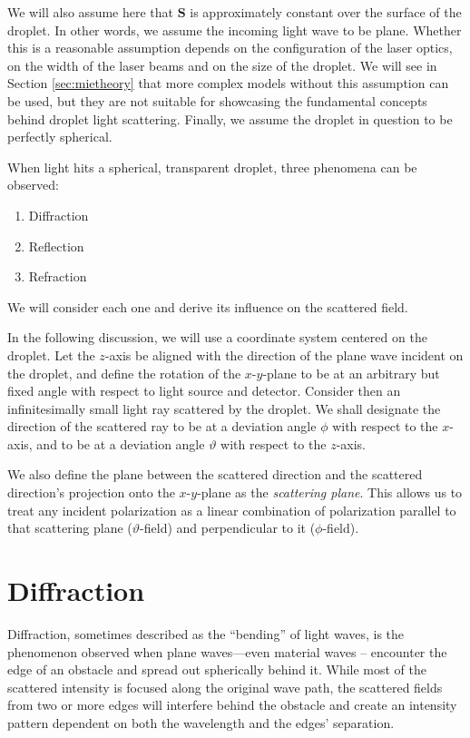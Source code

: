 \documentclass[11.5pt,oneside]{book}
\begin{document}
We will also assume here that $\mathbf{S}$ is approximately constant over the
surface of the droplet. In other words, we assume the incoming light wave to be
plane. Whether this is a reasonable assumption depends on the configuration of
the laser optics, on the width of the laser beams and on the size of the
droplet. We will see in Section \ref{sec:mietheory} that more complex models
without this assumption can be used, but they are not suitable for showcasing
the fundamental concepts behind droplet light scattering.  Finally, we assume
the droplet in question to be perfectly spherical.

When light hits a spherical, transparent droplet, three phenomena can be
observed:
\begin{enumerate}
    \item Diffraction
    \item Reflection
    \item Refraction
\end{enumerate}
We will consider each one and derive its influence on the
scattered field.

In the following discussion, we will use a coordinate system centered on the
droplet. Let the $z$-axis be aligned with the direction of the plane wave
incident on the droplet, and define the rotation of the $x$-$y$-plane to be at an
arbitrary but fixed angle with respect to light source and detector. Consider
then an infinitesimally small light ray scattered by the droplet. We shall
designate the direction of the scattered ray to be at a deviation angle $\phi$ with
respect to the $x$-axis, and to be at a deviation angle $\vartheta$ with respect
to the $z$-axis.

We also define the plane between the scattered direction and the scattered
direction's projection onto the $x$-$y$-plane as the \emph{scattering plane}. This
allows us to treat any incident polarization as a linear combination of
polarization parallel to that scattering plane ($\vartheta$-field) and
perpendicular to it ($\phi$-field). 

\section{Diffraction} Diffraction, sometimes described as the ``bending'' of
light waves, is the phenomenon observed when plane waves---even material waves
-- encounter the edge of an obstacle and spread out spherically behind it. While
most of the scattered intensity is focused along the original wave path, the
scattered fields from two or more edges will interfere behind the obstacle and
create an intensity pattern dependent on both the wavelength and the edges'
separation.
\end{document}
